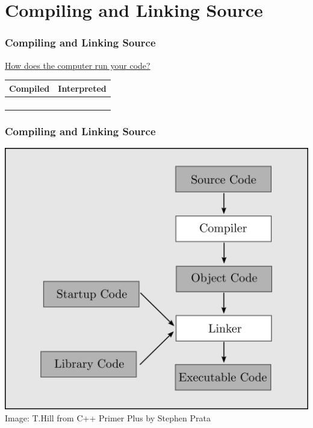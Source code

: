 \documentclass[fleqn]{beamer} %
\newcommand{\sectiontitleIII}{Compiling and Linking Source}
\begin{document}
\section{\sectiontitleIII}	
	\begin{frame}[label=sectionIII] \small
		\frametitle{\sectiontitleIII}    
		
		\underline{How does the computer run your code?} \vspace{5mm}\\
		
		\begin{tabular}{c|c} 
			\textbf{Compiled} \hspace{20mm} & \textbf{Interpreted} \hspace{20mm} \\ \hline
			 \hspace{20mm} &  \hspace{20mm} \\
			 \hspace{20mm} & \hspace{20mm} \\ 
			 \hspace{20mm} &  \hspace{20mm} \\
			 \hspace{20mm} & \hspace{20mm} \\
		
		\end{tabular}


	\end{frame}

	\begin{frame}[label=sectionIII] \small
		\frametitle{\sectiontitleIII}    
		
		\includegraphics[scale=.2]{building_cpp_program.png} \\
		
		\tiny{Image: T.Hill from C++ Primer Plus by Stephen Prata}
		
	\end{frame}
\end{document}
